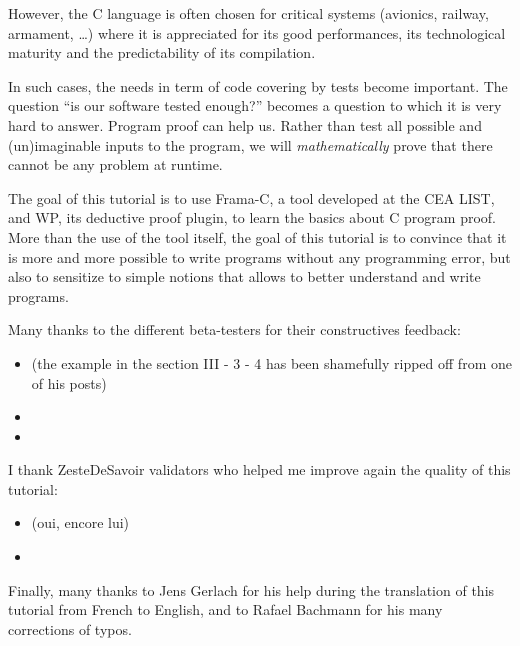 However, the C language is often chosen for critical systems (avionics,
railway, armament, \ldots{}) where it is appreciated for its good
performances, its technological maturity and the predictability of its
compilation.



In such cases, the needs in term of code covering by tests become
important. The question ``is our software tested enough?'' becomes a
question to which it is very hard to answer. Program proof can help us.
Rather than test all possible and (un)imaginable inputs to the program,
we will \emph{mathematically} prove that there cannot be any problem at
runtime.



The goal of this tutorial is to use Frama-C, a tool developed at the CEA
LIST, and WP, its deductive proof plugin, to learn the basics about C
program proof. More than the use of the tool itself, the goal of this
tutorial is to convince that it is more and more possible to write
programs without any programming error, but also to sensitize to simple
notions that allows to better understand and write programs.



\begin{Information}
  Many thanks to the different beta-testers for their constructives
  feedback:

\begin{itemize}
\item {} (the
    example in the section III - 3 - 4 has been shamefully ripped
    off from one of his posts)
\item {}
\item {}
\end{itemize}
  I thank ZesteDeSavoir validators who helped me improve again the quality of
  this tutorial:

\begin{itemize}
\item {} (oui, encore lui)
\item {}
\end{itemize}
  Finally, many thanks to Jens Gerlach for his help during the translation of
  this tutorial from French to English, and to Rafael Bachmann for his many
  corrections of typos.
\end{Information}
